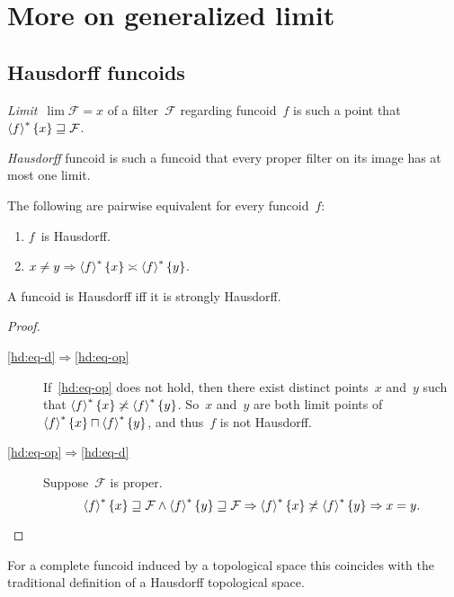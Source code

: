 \chapter{More on generalized limit}

\section{Hausdorff funcoids}

\begin{defn}
\emph{Limit}~$\lim\mathcal{F}=x$ of a filter~$\mathcal{F}$
regarding funcoid~$f$ is such a point that $\left\langle f\right\rangle ^{\ast}\{x\}\sqsupseteq\mathcal{F}$.
\end{defn}

\begin{defn}
\emph{Hausdorff} funcoid is such a funcoid that every proper
filter on its image has at most one limit.
\end{defn}

\begin{prop}
The following are pairwise equivalent for every funcoid~$f$:
\begin{enumerate}
\item\label{hd:eq-d} $f$~is Hausdorff.
\item\label{hd:eq-op}
$x\ne y\Rightarrow\left\langle f\right\rangle ^{\ast}\{x\}\asymp\left\langle f\right\rangle ^{\ast}\{y\}$.
\end{enumerate}
A funcoid is Hausdorff iff it is strongly Hausdorff.
\end{prop}

\begin{proof}
~
\begin{description}
\item[\ref{hd:eq-d}$\Rightarrow$\ref{hd:eq-op}]
If~\ref{hd:eq-op} does not hold,
then there exist distinct points~$x$ and~$y$ such that
$\left\langle f\right\rangle ^{\ast}\{x\}\not\asymp\left\langle f\right\rangle ^{\ast}\{y\}$.
So~$x$ and~$y$ are both limit points of
$\left\langle f\right\rangle ^{\ast}\{x\}\sqcap\left\langle f\right\rangle ^{\ast}\{y\}$, and thus~$f$ is not
Hausdorff.
\item[\ref{hd:eq-op}$\Rightarrow$\ref{hd:eq-d}]
Suppose~$\mathcal{F}$ is proper.
\[ \left\langle f\right\rangle ^{\ast}\{x\}\sqsupseteq\mathcal{F}\land
\left\langle f\right\rangle ^{\ast}\{y\}\sqsupseteq\mathcal{F}\Rightarrow
\left\langle f\right\rangle ^{\ast}\{x\}\not\asymp\left\langle f\right\rangle ^{\ast}\{y\}\Rightarrow x=y. \]
\end{description}
\end{proof}

\begin{obvious}
For a complete funcoid induced by a topological space this
coincides with the traditional definition of a Hausdorff
topological space.
\end{obvious}

